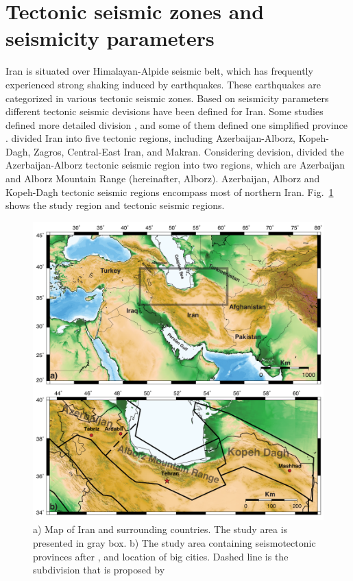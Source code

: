 
\section{Tectonic seismic zones and seismicity parameters}
\noindent
Iran is situated over Himalayan-Alpide seismic belt, which has frequently experienced strong shaking induced by earthquakes. These earthquakes are categorized in various tectonic seismic zones. Based on seismicity parameters different tectonic seismic devisions have been defined for Iran.  Some studies defined more detailed division \citep{Nowroozi1976, Tavakoli1999}, and some of them defined one simplified province \citep{Stocklin1968, Takin1972, Berberian1976}. \citet{Mirzaei1998} divided Iran into five tectonic regions, including Azerbaijan-Alborz, Kopeh-Dagh, Zagros, Central-East Iran, and Makran. Considering \citet{Mirzaei1998} devision, \citet{Karimiparidari2013} divided the Azerbaijan-Alborz tectonic seismic region into two regions, which are Azerbaijan and Alborz Mountain Range (hereinafter, Alborz). Azerbaijan, Alborz and Kopeh-Dagh tectonic seismic regions encompass most of northern Iran.  Fig.~\ref{fig:study_region} shows the study region and tectonic seismic regions. \\

\begin{figure} [ht]
\centering
\includegraphics[scale=0.6]{figures/pdf/Figure01.pdf} 
\caption{a) Map of Iran and surrounding countries. The study area is presented in gray box. b) The study area containing seismotectonic provinces after \citet{Mirzaei1998}, and location of big cities. Dashed line is the subdivision that is proposed by \citet{Karimiparidari2013}}
\label{fig:study_region}
\end{figure}




